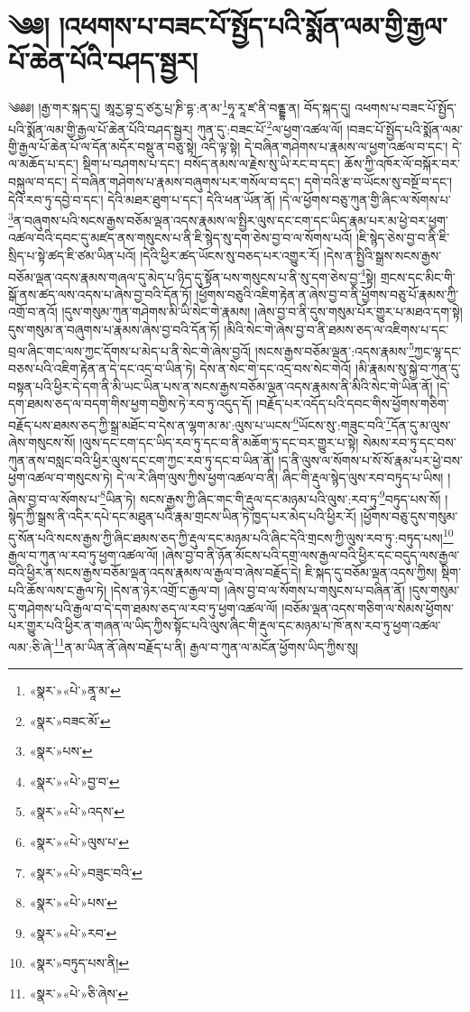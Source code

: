\chapter{༄༅། །འཕགས་པ་བཟང་པོ་སྤྱོད་པའི་སྨོན་ལམ་གྱི་རྒྱལ་པོ་ཆེན་པོའི་བཤད་སྦྱར།}༄༅༅། །རྒྱ་གར་སྐད་དུ། ཨཱརྱ་བྷ་དྲ་ཙརྱ་པྲ་ཎི་དྷ་:ན་མ་\footnote{«སྣར་»«པེ་»ནཱ་མ་}ཧཱ་རཱ་ཛ་ནི་བནྡྷ་ན། བོད་སྐད་དུ། འཕགས་པ་བཟང་པོ་སྤྱོད་པའི་སྨོན་ལམ་གྱི་རྒྱལ་པོ་ཆེན་པོའི་བཤད་སྦྱར། ཀུན་དུ་:བཟང་པོ་\footnote{«སྣར་»བཟང་མོ་}ལ་ཕྱག་འཚལ་ལོ། །བཟང་པོ་སྤྱོད་པའི་སྨོན་ལམ་གྱི་རྒྱལ་པོ་ཆེན་པོ་ལ་དོན་མདོར་བསྡུ་ན་བཅུ་སྟེ། འདི་ལྟ་སྟེ། དེ་བཞིན་གཤེགས་པ་རྣམས་ལ་ཕྱག་འཚལ་བ་དང་། དེ་ལ་མཆོད་པ་དང་། སྡིག་པ་བཤགས་པ་དང་། བསོད་ནམས་ལ་རྗེས་སུ་ཡི་རང་བ་དང་། ཆོས་ཀྱི་འཁོར་ལོ་བསྐོར་བར་བསྐུལ་བ་དང་། དེ་བཞིན་གཤེགས་པ་རྣམས་བཞུགས་པར་གསོལ་བ་དང་། དགེ་བའི་རྩ་བ་ཡོངས་སུ་བསྔོ་བ་དང་། དེའི་རབ་ཏུ་དབྱེ་བ་དང་། དེའི་མཐར་ཐུག་པ་དང་། དེའི་ཕན་ཡོན་ནོ། །དེ་ལ་ཕྱོགས་བཅུ་ཀུན་གྱི་ཞིང་ལ་སོགས་པ་\footnote{«སྣར་»པས་}ན་བཞུགས་པའི་སངས་རྒྱས་བཅོམ་ལྡན་འདས་རྣམས་ལ་སྤྱིར་ལུས་དང་ངག་དང་ཡིད་རྣམ་པར་མ་ཕྱེ་བར་ཕྱག་འཚལ་བའི་དབང་དུ་མཛད་ནས་གསུངས་པ་ནི་ཇི་སྙེད་སུ་དག་ཅེས་བྱ་བ་ལ་སོགས་པའོ། །ཇི་སྙེད་ཅེས་བྱ་བ་ནི་ཇི་སྲིད་པ་སྟེ་ཚད་ཇི་ཙམ་ཡིན་པའོ། །དེའི་ཕྱིར་ཚད་ཡོངས་སུ་བཅད་པར་འགྱུར་རོ། །དེས་ན་སྤྱིའི་སྒྲས་སངས་རྒྱས་བཅོམ་ལྡན་འདས་རྣམས་གཞལ་དུ་མེད་པ་ཉིད་དུ་སྟོན་པས་གསུངས་པ་ནི་སུ་དག་ཅེས་བྱ་\footnote{«སྣར་»«པེ་»བྱ་བ་}སྟེ། གྲངས་དང་མིང་གི་སྒོ་ནས་ཚད་ལས་འདས་པ་ཞེས་བྱ་བའི་དོན་ཏོ། །ཕྱོགས་བཅུའི་འཇིག་རྟེན་ན་ཞེས་བྱ་བ་ནི་ཕྱོགས་བཅུ་པོ་རྣམས་ཀྱི་འགྲོ་བ་ནའོ། །དུས་གསུམ་ཀུན་གཤེགས་མི་ཡི་སེང་གེ་རྣམས། །ཞེས་བྱ་བ་ནི་དུས་གསུམ་པོར་གྱུར་པ་མཐའ་དག་སྟེ། དུས་གསུམ་ན་བཞུགས་པ་རྣམས་ཞེས་བྱ་བའི་དོན་ཏོ། །མིའི་སེང་གེ་ཞེས་བྱ་བ་ནི་ཐམས་ཅད་ལ་འཇིགས་པ་དང་བྲལ་ཞིང་གང་ལས་ཀྱང་དོགས་པ་མེད་པ་ནི་སེང་གེ་ཞེས་བྱའོ། །སངས་རྒྱས་བཅོམ་ལྡན་:འདས་རྣམས་\footnote{«སྣར་»«པེ་»འདས་}ཀྱང་ལྷ་དང་བཅས་པའི་འཇིག་རྟེན་ན་དེ་དང་འདྲ་བ་ཡིན་ཏེ། དེས་ན་སེང་གེ་དང་འདྲ་བས་སེང་གེའོ། །མི་རྣམས་སུ་སྐྱེ་བ་ཀུན་དུ་བསྟན་པའི་ཕྱིར་དེ་དག་ནི་མི་ཡང་ཡིན་པས་ན་སངས་རྒྱས་བཅོམ་ལྡན་འདས་རྣམས་ནི་མིའི་སེང་གེ་ཡིན་ནོ། །དེ་དག་ཐམས་ཅད་ལ་བདག་གིས་ཕྱག་བགྱིས་ཏེ་རབ་ཏུ་འདུད་དོ། །བརྗོད་པར་འདོད་པའི་དབང་གིས་ཕྱོགས་གཅིག་བརྗོད་པས་ཐམས་ཅད་ཀྱི་སྒྲ་མཐོང་བ་དེས་ན་ལྷག་མ་མ་:ལུས་པ་ཡངས་\footnote{«སྣར་»«པེ་»ལུས་པ་}ཡོངས་སུ་:གཟུང་བའི་\footnote{«སྣར་»«པེ་»བཟུང་བའི་}དོན་དུ་མ་ལུས་ཞེས་གསུངས་སོ། །ལུས་དང་ངག་དང་ཡིད་རབ་ཏུ་དང་བ་ནི་མཆོག་ཏུ་དང་བར་གྱུར་པ་སྟེ། སེམས་རབ་ཏུ་དང་བས་ཀུན་ནས་བསླང་བའི་ཕྱིར་ལུས་དང་ངག་ཀྱང་རབ་ཏུ་དང་བ་ཡིན་ནོ། །ད་ནི་ལུས་ལ་སོགས་པ་སོ་སོ་རྣམ་པར་ཕྱེ་བས་ཕྱག་འཚལ་བ་གསུངས་ཏེ། དེ་ལ་རེ་ཞིག་ལུས་ཀྱིས་ཕྱག་འཚལ་བ་ནི། ཞིང་གི་རྡུལ་སྙེད་ལུས་རབ་བཏུད་པ་ཡིས། །ཞེས་བྱ་བ་ལ་སོགས་པ་\footnote{«སྣར་»«པེ་»པས་}ཡིན་ཏེ། སངས་རྒྱས་ཀྱི་ཞིང་གང་གི་རྡུལ་དང་མཉམ་པའི་ལུས་:རབ་ཏུ་\footnote{«སྣར་»«པེ་»རབ་}བཏུད་པས་སོ། །སྙེད་ཀྱི་སྒྲས་ནི་འདིར་དཔེ་དང་མཐུན་པའི་རྣམ་གྲངས་ཡིན་ཏེ་ཁྱད་པར་མེད་པའི་ཕྱིར་རོ། །ཕྱོགས་བཅུ་དུས་གསུམ་དུ་སོན་པའི་སངས་རྒྱས་ཀྱི་ཞིང་ཐམས་ཅད་ཀྱི་རྡུལ་དང་མཉམ་པའི་ཞིང་དེའི་གྲངས་ཀྱི་ལུས་རབ་ཏུ་:བཏུད་པས།\footnote{«སྣར་»བཏུད་པས་ནི།} རྒྱལ་བ་ཀུན་ལ་རབ་ཏུ་ཕྱག་འཚལ་ལོ། །ཞེས་བྱ་བ་ནི་ཉོན་མོངས་པའི་དགྲ་ལས་རྒྱལ་བའི་ཕྱིར་དང་བདུད་ལས་རྒྱལ་བའི་ཕྱིར་ན་སངས་རྒྱས་བཅོམ་ལྡན་འདས་རྣམས་ལ་རྒྱལ་བ་ཞེས་བརྗོད་དེ། ཇི་སྐད་དུ་བཅོམ་ལྡན་འདས་ཀྱིས། སྡིག་པའི་ཆོས་ལས་ང་རྒྱལ་ཏེ། །དེས་ན་ཉེར་འགྲོ་ང་རྒྱལ་བ། །ཞེས་བྱ་བ་ལ་སོགས་པ་གསུངས་པ་བཞིན་ནོ། །དུས་གསུམ་དུ་གཤེགས་པའི་རྒྱལ་བ་དེ་དག་ཐམས་ཅད་ལ་རབ་ཏུ་ཕྱག་འཚལ་ལོ། །བཅོམ་ལྡན་འདས་གཅིག་ལ་སེམས་ཕྱོགས་པར་གྱུར་པའི་ཕྱིར་ན་གཞན་ལ་ཡིད་ཀྱིས་སྟོང་པའི་ལུས་ཞིང་གི་རྡུལ་དང་མཉམ་པ་ཁོ་ནས་རབ་ཏུ་ཕྱག་འཚལ་ལམ་:ཅི་ཞེ་\footnote{«སྣར་»«པེ་»ཅི་ཞེས་}ན་མ་ཡིན་ནོ་ཞེས་བརྗོད་པ་ནི། རྒྱལ་བ་ཀུན་ལ་མངོན་ཕྱོགས་ཡིད་ཀྱིས་སུ། 
